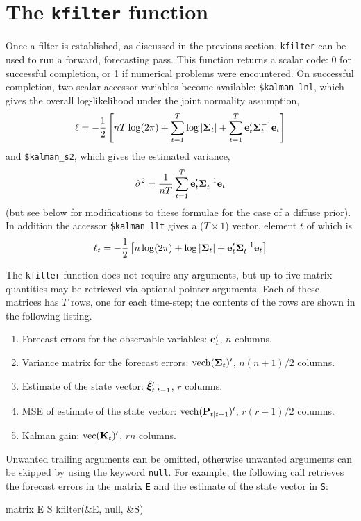 \section{The \texttt{kfilter} function}

Once a filter is established, as discussed in the previous section,
\texttt{kfilter} can be used to run a forward, forecasting pass.
This function returns a scalar code: 0 for successful completion, or 1
if numerical problems were encountered.  On successful completion, two
scalar accessor variables become available: \verb+$kalman_lnl+, which
gives the overall log-likelihood under the joint normality assumption,
%
\[
  \ell = -\frac{1}{2} \left[nT \log(2 \pi) + \sum_{t=1}^T\log \left|\bm{\Sigma}_t\right| + 
    \sum_{t=1}^T\mathbf{e}_t'\bm{\Sigma}_t^{-1} \mathbf{e}_t
  \right]
\]
%
and \verb+$kalman_s2+, which gives the estimated variance,
%
\[
\hat{\sigma}^2 = \frac{1}{nT} 
   \sum_{t=1}^T\mathbf{e}_t'\bm{\Sigma}_t^{-1} \mathbf{e}_t
\]
(but see below for modifications to these formulae for the case of a
diffuse prior).  In addition the accessor \verb+$kalman_llt+ gives a
($T \times 1$) vector, element $t$ of which is
%
\[
  \ell_t = -\frac{1}{2} \left[n \log(2 \pi) + \log \left|\bm{\Sigma}_t\right| + 
    \mathbf{e}_t'\bm{\Sigma}_t^{-1} \mathbf{e}_t
  \right]
\]
%

The \texttt{kfilter} function does not require any arguments, but up
to five matrix quantities may be retrieved via optional pointer
arguments.  Each of these matrices has $T$ rows, one for each
time-step; the contents of the rows are shown in the following
listing.
%
\begin{enumerate}
\item Forecast errors for the observable variables: $\mathbf{e}_t'$, $n$
  columns.
\item Variance matrix for the forecast errors: $\mbox{vech}(\bm{\Sigma}_t)'$,
  $n(n+1)/2$ columns.
\item Estimate of the state vector: $\hat{\bm{\xi}}_{t|t-1}'$, $r$ columns.
\item MSE of estimate of the state vector:
  $\mbox{vech}(\mathbf{P}_{t|t-1})'$, $r(r+1)/2$ columns.
\item Kalman gain: $\mbox{vec}(\mathbf{K}_t)'$, $rn$ columns.
\end{enumerate}

Unwanted trailing arguments can be omitted, otherwise unwanted
arguments can be skipped by using the keyword \texttt{null}.  For
example, the following call retrieves the forecast errors in the
matrix \texttt{E} and the estimate of the state vector in \texttt{S}:
%
\begin{code}
matrix E S
kfilter(&E, null, &S)
\end{code}

